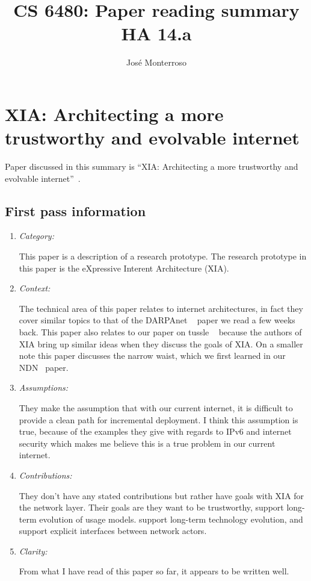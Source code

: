 \documentclass[letterpaper,twocolumn,10pt]{article}
\title{CS 6480: Paper reading summary\\
HA 14.a\\}
\author{José Monterroso }
\affil{School of Computing, University of Utah}
\begin{document}
\maketitle
\section{XIA: Architecting a more trustworthy and evolvable internet}

Paper discussed in this summary is ``XIA: Architecting a more trustworthy and evolvable internet''~\cite{xia}.

\subsection{First pass information}
\label{sec:first}
\begin{enumerate}

\item {\it Category:}

This paper is a description of a research prototype. The research prototype in this paper is the eXpressive 
Interent Architecture (XIA). 

\item {\it Context:} 

The technical area of this paper relates to internet architectures, in fact they cover similar topics to that of the 
DARPAnet ~\cite{darpa} paper we read a few weeks back. This paper also relates to our paper on tussle ~\cite{tussle}
because the authors of XIA bring up similar ideas when they discuss the goals of XIA. On a smaller note this 
paper discusses the narrow waist, which we first learned in our NDN~\cite{ndn} paper.

\item {\it Assumptions:} 

They make the assumption that with our current internet, it is difficult to provide a clean path for incremental 
deployment. I think this assumption is true, because of the examples they give with regards to IPv6 and 
internet security which makes me believe this is a true problem in our current internet.

\item {\it Contributions:} 

They don't have any stated contributions but rather have goals with XIA for the network layer. Their goals are 
they want to be trustworthy, support long-term evolution of usage models. support long-term technology
evolution, and support explicit interfaces between network actors. 

\item {\it Clarity:}

From what I have read of this paper so far, it appears to be written well. 

\end{enumerate}
\end{document}
